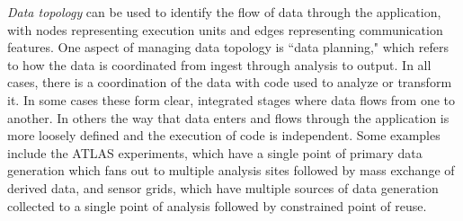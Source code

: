 


{\it Data topology} can be used to identify the flow of data through the
application, with nodes representing execution units and edges representing
communication features.  One aspect of managing data topology is ``data
planning," which refers to how the data is coordinated from ingest through
analysis to output. In all cases, there is a coordination of the data with code
used to analyze or transform it. In some cases these form clear, integrated
stages where data flows from one to another. In others the way that data enters
and flows through the application is more loosely defined and the execution of
code is independent. Some examples include the ATLAS experiments, which have a
single point of primary data generation which fans out to multiple analysis
sites followed by mass exchange of derived data, and sensor grids, which have
multiple sources of data generation collected to a single point of analysis
followed by constrained point of reuse.


